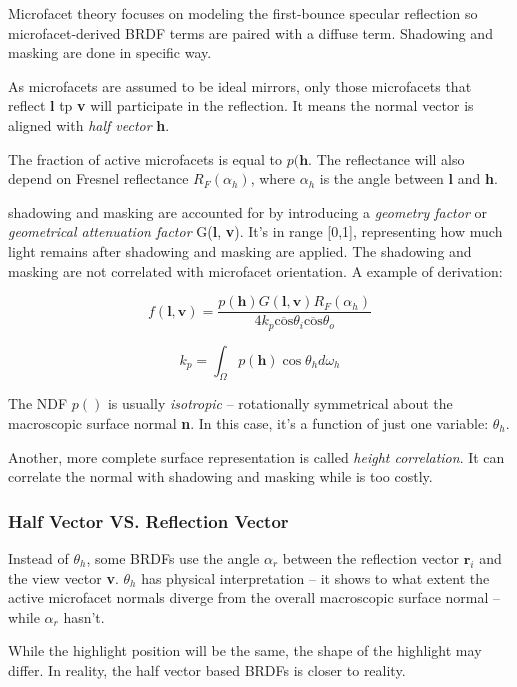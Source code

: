 \documentclass[10pt, a4paper]{article}
\begin{document}
            Microfacet theory focuses on modeling the first-bounce specular reflection so microfacet-derived BRDF terms are paired with a diffuse term. Shadowing and masking are done in specific way. 

            As microfacets are assumed to be ideal mirrors, only those microfacets that reflect \textbf{l} tp \textbf{v} will participate in the reflection. It means the normal vector is aligned with \emph{half vector} \textbf{h}.

            The fraction of active microfacets is equal to $p(\textbf{h}$. The reflectance will also depend on Fresnel reflectance $R_F(\alpha_h)$, where $\alpha_h$ is the angle between \textbf{l} and \textbf{h}. 

            shadowing and masking are accounted for by introducing a \emph{geometry factor} or \emph{geometrical attenuation factor} G(\textbf{l}, \textbf{v}). It's in range [0,1], representing how much light remains after shadowing and masking are applied. The shadowing and masking are not correlated with microfacet orientation. A example of derivation:

            $$f(\textbf{l}, \textbf{v}) = \frac{p(\textbf{h})G(\textbf{l},\textbf{v})R_F(\alpha_h)}{4k_p\overline{\text{cos}}\theta_i\overline{\text{cos}}\theta_o}$$
            
            $$k_p = \int_{\Omega}p(\textbf{h})\cos{\theta_h}d\omega_h$$

            The NDF $p()$ is usually \emph{isotropic} -- rotationally symmetrical about the macroscopic surface normal \textbf{n}. In this case, it's a function of just one variable: $\theta_h$.

            Another, more complete surface representation is called \emph{height correlation}. It can correlate the normal with shadowing and masking while is too costly. 

        \subsubsection{Half Vector VS. Reflection Vector}
            Instead of $\theta_h$, some BRDFs use the angle $\alpha_r$ between the reflection vector $\textbf{r}_i$ and the view vector \textbf{v}. $\theta_h$ has physical interpretation -- it shows to what extent the active microfacet normals diverge from the overall macroscopic surface normal -- while $\alpha_r$ hasn't. 

            While the highlight position will be the same, the shape of the highlight may differ. In reality, the half vector based BRDFs is closer to reality. 
    
\end{document}
